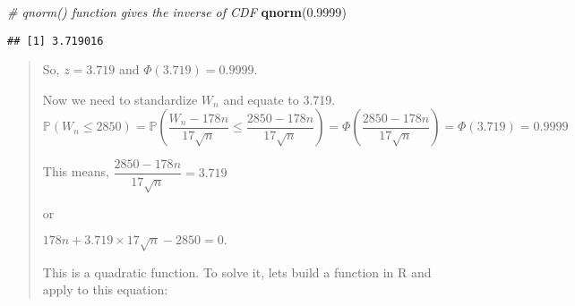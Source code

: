 \documentclass[
]{article}
\newenvironment{Shaded}{\begin{snugshade}}{\end{snugshade}}
\newcommand{\CommentTok}[1]{\textcolor[rgb]{0.56,0.35,0.01}{\textit{#1}}}
\newcommand{\FloatTok}[1]{\textcolor[rgb]{0.00,0.00,0.81}{#1}}
\newcommand{\FunctionTok}[1]{\textcolor[rgb]{0.13,0.29,0.53}{\textbf{#1}}}
\newcommand{\NormalTok}[1]{#1}
\begin{document}
\begin{Shaded}
\begin{Highlighting}[]
\CommentTok{\# qnorm() function gives the inverse of CDF }
\FunctionTok{qnorm}\NormalTok{(}\FloatTok{0.9999}\NormalTok{)}
\end{Highlighting}
\end{Shaded}

\begin{verbatim}
## [1] 3.719016
\end{verbatim}

\begin{quote}
So, \(z = 3.719\) and \(\Phi(3.719) = 0.9999\).

Now we need to standardize \(W_n\) and equate to 3.719. \[
\mathbb{P}(W_n \leq 2850) = \mathbb{P}\left(\frac{W_n - 178n}{17\sqrt{n}} \leq \frac{2850 - 178n}{17\sqrt{n}}\right) = \Phi\left(\frac{2850-178n}{17\sqrt{n}}\right) = \Phi(3.719) = 0.9999
\]

This means, \(\dfrac{2850-178n}{17\sqrt{n}} = 3.719\)

or

\(178n + 3.719 \times 17\sqrt{n} - 2850 = 0.\)

This is a quadratic function. To solve it, lets build a function in R
and apply to this equation:
\end{quote}
\end{document}
